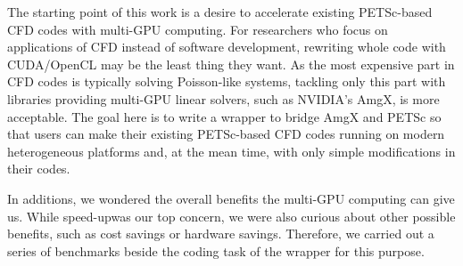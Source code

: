 The starting point of this work is a desire to accelerate existing 
PETSc\cite{petsc-web-page}-based CFD codes with multi-GPU computing.
For researchers who focus on applications of CFD instead of software development,
rewriting whole code with CUDA/OpenCL may be the least thing they want.
As the most expensive part in CFD codes is typically solving Poisson-like systems,
tackling only this part with libraries providing multi-GPU linear solvers, 
such as NVIDIA's AmgX\cite{amgx-web-page}, is more acceptable.
The goal here is to write a wrapper to bridge AmgX and PETSc so that users can 
make their existing PETSc-based CFD codes running on modern heterogeneous platforms
and, at the mean time, with only simple modifications in their codes.

In additions, we wondered the overall benefits the multi-GPU computing can give us.
While speed-up\footnotemark was our top concern, we were also curious 
about other possible benefits, such as cost savings or hardware savings.
Therefore, we carried out a series of benchmarks beside the coding task of the 
wrapper for this purpose.

